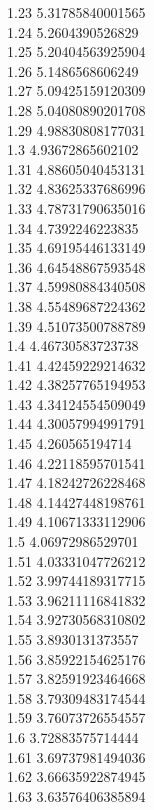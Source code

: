 {1.23	5.31785840001565\\
1.24	5.2604390526829\\
1.25	5.20404563925904\\
1.26	5.1486568606249\\
1.27	5.09425159120309\\
1.28	5.04080890201708\\
1.29	4.98830808177031\\
1.3	4.93672865602102\\
1.31	4.88605040453131\\
1.32	4.83625337686996\\
1.33	4.78731790635016\\
1.34	4.7392246223835\\
1.35	4.69195446133149\\
1.36	4.64548867593548\\
1.37	4.59980884340508\\
1.38	4.55489687224362\\
1.39	4.51073500788789\\
1.4	4.46730583723738\\
1.41	4.42459229214632\\
1.42	4.38257765194953\\
1.43	4.34124554509049\\
1.44	4.30057994991791\\
1.45	4.260565194714\\
1.46	4.22118595701541\\
1.47	4.18242726228468\\
1.48	4.14427448198761\\
1.49	4.10671333112906\\
1.5	4.06972986529701\\
1.51	4.03331047726212\\
1.52	3.99744189317715\\
1.53	3.96211116841832\\
1.54	3.92730568310802\\
1.55	3.8930131373557\\
1.56	3.85922154625176\\
1.57	3.82591923464668\\
1.58	3.79309483174544\\
1.59	3.76073726554557\\
1.6	3.72883575714444\\
1.61	3.69737981494036\\
1.62	3.66635922874945\\
1.63	3.63576406385894\\
}
